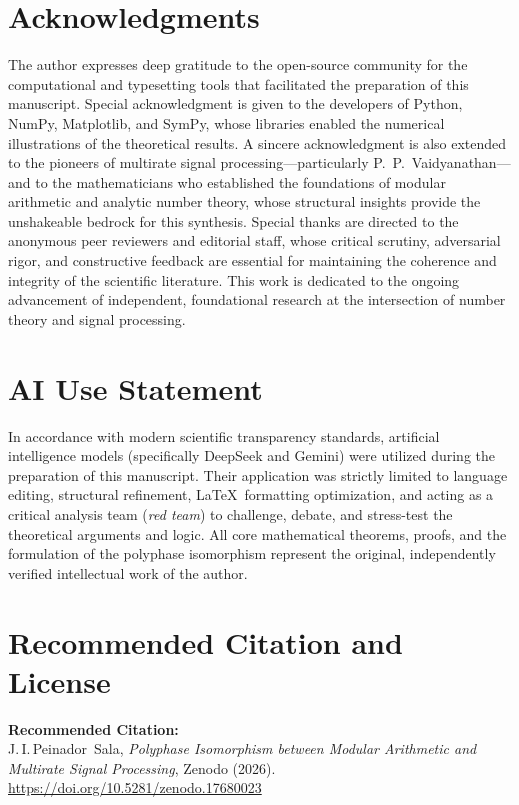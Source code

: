 \documentclass[12pt,a4paper]{article}
\theoremstyle{plain}
\theoremstyle{definition}
\theoremstyle{remark}
\begin{document}
\section*{Acknowledgments}
The author expresses deep gratitude to the open-source community for the computational and typesetting tools that facilitated the preparation of this manuscript. Special acknowledgment is given to the developers of Python, NumPy, Matplotlib, and SymPy, whose libraries enabled the numerical illustrations of the theoretical results. A sincere acknowledgment is also extended to the pioneers of multirate signal processing—particularly P.~P.~Vaidyanathan—and to the mathematicians who established the foundations of modular arithmetic and analytic number theory, whose structural insights provide the unshakeable bedrock for this synthesis. Special thanks are directed to the anonymous peer reviewers and editorial staff, whose critical scrutiny, adversarial rigor, and constructive feedback are essential for maintaining the coherence and integrity of the scientific literature. This work is dedicated to the ongoing advancement of independent, foundational research at the intersection of number theory and signal processing.

\section*{AI Use Statement}
In accordance with modern scientific transparency standards, artificial intelligence models (specifically DeepSeek and Gemini) were utilized during the preparation of this manuscript. Their application was strictly limited to language editing, structural refinement, \LaTeX\ formatting optimization, and acting as a critical analysis team (\textit{red team}) to challenge, debate, and stress-test the theoretical arguments and logic. All core mathematical theorems, proofs, and the formulation of the polyphase isomorphism represent the original, independently verified intellectual work of the author.

\section*{Recommended Citation and License}

\noindent\textbf{Recommended Citation:} \\
J.\,I.\,Peinador~Sala, \emph{Polyphase Isomorphism between Modular Arithmetic and Multirate Signal Processing}, Zenodo (2026). \url{https://doi.org/10.5281/zenodo.17680023}
\end{document}
